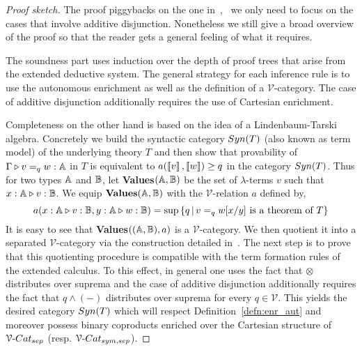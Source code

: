 \documentclass[a4paper,UKenglish,cleveref, autoref, thm-restate]{lipics-v2021}
\begin{document}
\begin{proof}[Proof sketch]
        The proof piggybacks on the one
        in~\cite{dahlqvist22,dahlqvist2023syntactic}, \ie\ we only
        need to focus on the cases that involve additive disjunction.
        Nonetheless we still give a broad overview of the proof so that the
        reader gets a general feeling of what it requires.

        The soundness part uses induction over the depth of proof trees that
        arise from the extended deductive system. The general strategy for each
        inference rule is to use the autonomous enrichment as well as the
        definition of a $\mathcal{V}$-category.  The case of additive
        disjunction additionally requires the use of Cartesian enrichment.

        Completeness on the other hand is based on the idea of a
        Lindenbaum-Tarski algebra. Concretely we build the syntactic category
        $\catfont{Syn}(T)$ (also known as term model) of the underlying  theory
        $T$ and then show that provability of $\Gamma \triangleright v =_q w : \mathbb{A}$
        in $T$ is equivalent to $a(\left \llbracket v \right \rrbracket,\left \llbracket w \right \rrbracket) \geq q$ in the category
        $\catfont{Syn}(T)$. Thus for two types $\mathbb{A}$ and $\mathbb{B}$, let
        \textbf{Values}$(\mathbb{A},\mathbb{B})$ be the set of $\lambda$-terms $v$ such
        that $x : \mathbb{A} \triangleright v : \mathbb{B}$. We equip
        $\textbf{Values}(\mathbb{A},\mathbb{B})$ with the $\mathcal{V}$-relation $a$ defined by,
        \[
                        a(x : \mathbb{A} \triangleright v : \mathbb{B}, y : \mathbb{A} \triangleright  w : \mathbb{B})
                        =\sup {\{q \, \vert \,
                        v=_q w[x/y] \text{ is a theorem of } T \}}
        \]
        It is easy to see that \textbf{Values}$((\mathbb{A},\mathbb{B}),a)$ is a
        $\mathcal{V}$-category. We then quotient it into a separated
        $\mathcal{V}$-category via the construction detailed
        in~\cite{dahlqvist22,dahlqvist2023syntactic}. The next step is to prove
        that this quotienting procedure is compatible with the term formation
        rules of the extended calculus. To this effect, in general one uses the fact
        that $\otimes$ distributes over suprema and the case of additive
        disjunction additionally requires the fact that $q \wedge (-)$
        distributes over suprema for every $q \in \mathcal{V}$. This yields the
        desired category $\catfont{Syn}(T)$ which will respect
        Definition~\ref{defn:enr_aut} and moreover possess binary coproducts
        enriched over the Cartesian structure of $\VCatSe$ (resp. $\VCatSS$).


\end{proof}
\end{document}
